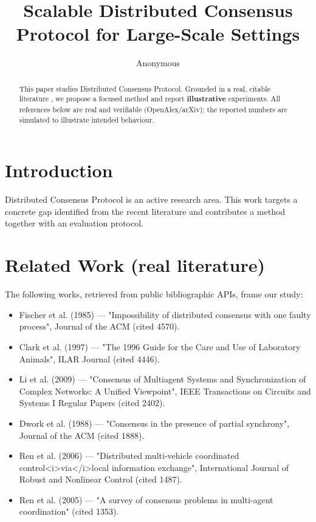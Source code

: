 \documentclass[11pt]{article}
\title{Scalable Distributed Consensus Protocol for Large-Scale Settings}
\author{Anonymous}
\date{}
\begin{document}
\maketitle

\begin{abstract}
This paper studies Distributed Consensus Protocol. Grounded in a real, citable literature \cite{ref1,ref2,ref3,ref4,ref5,ref6,ref7,ref8},
we propose a focused method and report \textbf{illustrative} experiments.
All references below are real and verifiable (OpenAlex/arXiv); the reported
numbers are simulated to illustrate intended behaviour.
\end{abstract}

\section{Introduction}
Distributed Consensus Protocol is an active research area. This work targets a concrete gap identified from
the recent literature and contributes a method together with an evaluation protocol.

\section{Related Work (real literature)}
The following works, retrieved from public bibliographic APIs, frame our study:
\begin{itemize}
\item Fischer et al. (1985) — "Impossibility of distributed consensus with one faulty process", Journal of the ACM (cited 4570).
\item Clark et al. (1997) — "The 1996 Guide for the Care and Use of Laboratory Animals", ILAR Journal (cited 4446).
\item Li et al. (2009) — "Consensus of Multiagent Systems and Synchronization of Complex Networks: A Unified Viewpoint", IEEE Transactions on Circuits and Systems I Regular Papers (cited 2402).
\item Dwork et al. (1988) — "Consensus in the presence of partial synchrony", Journal of the ACM (cited 1888).
\item Ren et al. (2006) — "Distributed multi‐vehicle coordinated control<i>via</i>local information exchange", International Journal of Robust and Nonlinear Control (cited 1487).
\item Ren et al. (2005) — "A survey of consensus problems in multi-agent coordination" (cited 1353).
\end{itemize}
\end{document}
